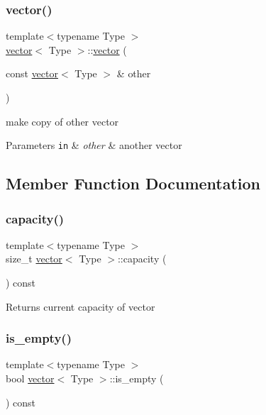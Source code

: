 \subsubsection{\texorpdfstring{vector()}{vector()}\hspace{0.1cm}{\footnotesize\ttfamily [2/2]}}
{\footnotesize\ttfamily template$<$typename Type $>$ \\
\hyperlink{classvector}{vector}$<$ Type $>$\+::\hyperlink{classvector}{vector} (\begin{DoxyParamCaption}\item[{const \hyperlink{classvector}{vector}$<$ Type $>$ \&}]{other }\end{DoxyParamCaption})}

make copy of other vector 
\begin{DoxyParams}[1]{Parameters}
\mbox{\tt in}  & {\em other} & another vector \\
\hline
\end{DoxyParams}


\subsection{Member Function Documentation}
\mbox{\label{classvector_a328c8b698588cbe76e44fa358f94cc83}} 
\subsubsection{\texorpdfstring{capacity()}{capacity()}}
{\footnotesize\ttfamily template$<$typename Type $>$ \\
size\+\_\+t \hyperlink{classvector}{vector}$<$ Type $>$\+::capacity (\begin{DoxyParamCaption}{ }\end{DoxyParamCaption}) const}

\begin{DoxyReturn}{Returns}
current capacity of vector 
\end{DoxyReturn}
\mbox{\label{classvector_a5072f21798cab28caba5ce11a63641b9}} 
\subsubsection{\texorpdfstring{is\+\_\+empty()}{is\_empty()}}
{\footnotesize\ttfamily template$<$typename Type $>$ \\
bool \hyperlink{classvector}{vector}$<$ Type $>$\+::is\+\_\+empty (\begin{DoxyParamCaption}{ }\end{DoxyParamCaption}) const}

